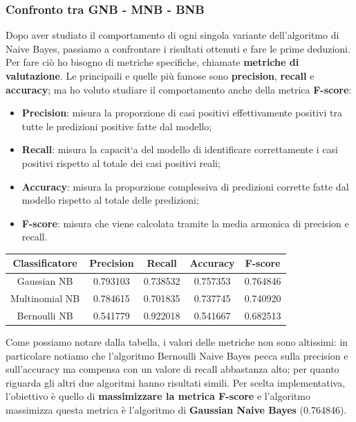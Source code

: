 \documentclass{article}
\begin{document}
\begin{titlepage}
        \subsubsection{Confronto tra GNB - MNB - BNB}
        Dopo aver studiato il comportamento di ogni singola variante dell'algoritmo di Naive Bayes, passiamo a confrontare i risultati ottenuti e fare le prime deduzioni. Per fare ciò ho bisogno di metriche specifiche, chiamate \textbf{metriche di valutazione}. Le principaili e quelle più famose sono \textbf{precision}, \textbf{recall} e \textbf{accuracy}; ma ho voluto studiare il comportamento anche della metrica \textbf{F-score}:
        \begin{itemize}
            \item \textbf{Precision}: misura la proporzione di casi positivi effettivamente positivi tra tutte le predizioni positive fatte dal modello;
            \item \textbf{Recall}: misura la capacit`a del modello di identificare correttamente i casi positivi rispetto al totale dei casi positivi reali;
            \item \textbf{Accuracy}: misura la proporzione complessiva di predizioni corrette fatte dal modello rispetto al totale delle predizioni;
            \item \textbf{F-score}: misura che viene calcolata tramite la media armonica di precision e recall.
        \end{itemize}
        \newpage
        \begin{center}
        \begin{tabular}{|c|c|c|c|c|}
            \hline
            \textbf{Classificatore} & \textbf{Precision} & \textbf{Recall} & \textbf{Accuracy}& \textbf{F-score}\\ \hline
            Gaussian NB & 0.793103 & 0.738532 & 0.757353 & 0.764846\\ \hline
            Multinomial NB & 0.784615 & 0.701835 & 0.737745 & 0.740920\\ \hline
            Bernoulli NB & 0.541779 & 0.922018 & 0.541667 & 0.682513\\ \hline
        \end{tabular}
        \end{center}

        Come possiamo notare dalla tabella, i valori delle metriche non sono altissimi: in particolare notiamo che l'algoritmo Bernoulli Naive Bayes pecca sulla precision e sull'accuracy ma compensa con un valore di recall abbastanza alto; per quanto riguarda gli altri due algoritmi hanno risultati simili. Per scelta implementativa, l'obiettivo è quello di \textbf{massimizzare la metrica F-score} e l'algoritmo massimizza questa metrica è l'algoritmo di \textbf{Gaussian Naive Bayes} (0.764846). 


\end{titlepage}
\end{document}
